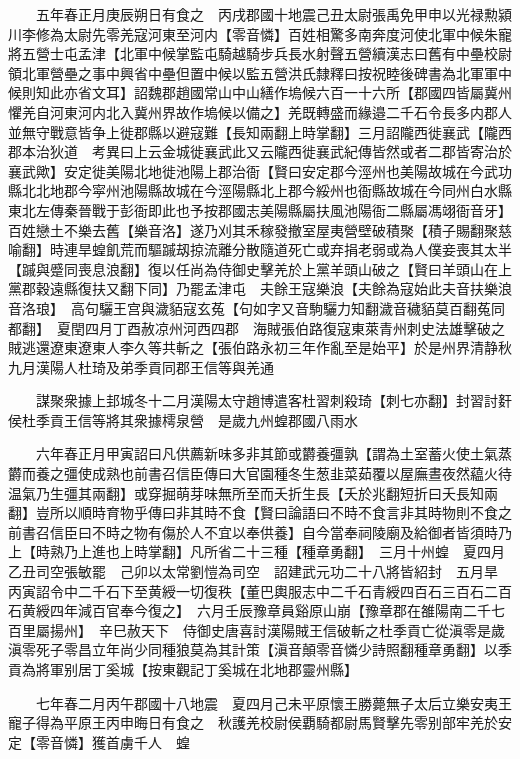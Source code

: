 　　五年春正月庚辰朔日有食之　丙戌郡國十地震己丑太尉張禹免甲申以光禄勲潁川李修為太尉先零羌寇河東至河内【零音憐】百姓相驚多南奔度河使北軍中候朱寵將五營士屯孟津【北軍中候掌監屯騎越騎步兵長水射聲五營續漢志曰舊有中壘校尉領北軍營壘之事中興省中壘但置中候以監五營洪氏隸釋曰按祝睦後碑書為北軍軍中候則知此亦省文耳】詔魏郡趙國常山中山繕作塢候六百一十六所【郡國四皆屬冀州懼羌自河東河内北入冀州界故作塢候以備之】羌既轉盛而緣邉二千石令長多内郡人並無守戰意皆争上徙郡縣以避寇難【長知兩翻上時掌翻】三月詔隴西徙襄武【隴西郡本治狄道　考異曰上云金城徙襄武此又云隴西徙襄武紀傳皆然或者二郡皆寄治於襄武歟】安定徙美陽北地徙池陽上郡治衙【賢曰安定郡今涇州也美陽故城在今武功縣北北地郡今寜州池陽縣故城在今涇陽縣北上郡今綏州也衙縣故城在今同州白水縣東北左傳秦晉戰于彭衙即此也予按郡國志美陽縣屬扶風池陽衙二縣屬馮翊衙音牙】百姓戀土不樂去舊【樂音洛】遂乃刈其禾稼發撤室屋夷營壁破積聚【積子賜翻聚慈喻翻】時連旱蝗飢荒而驅䠞刼掠流離分散隨道死亡或弃捐老弱或為人僕妾喪其太半【䠞與蹙同喪息浪翻】復以任尚為侍御史擊羌於上黨羊頭山破之【賢曰羊頭山在上黨郡穀遠縣復扶又翻下同】乃罷孟津屯　夫餘王寇樂浪【夫餘為寇始此夫音扶樂浪音洛琅】　高句驪王宫與濊貊寇玄菟【句如字又音駒驪力知翻濊音穢貊莫百翻菟同都翻】　夏閏四月丁酉赦凉州河西四郡　海賊張伯路復寇東萊青州刺史法雄擊破之賊逃還遼東遼東人李久等共斬之【張伯路永初三年作亂至是始平】於是州界清静秋九月漢陽人杜琦及弟季貢同郡王信等與羌通

　　謀聚衆據上邽城冬十二月漢陽太守趙博遣客杜習刺殺琦【刺七亦翻】封習討姧侯杜季貢王信等將其衆據樗泉營　是歲九州蝗郡國八雨水

　　六年春正月甲寅詔曰凡供薦新味多非其節或欝養彊孰【謂為土室蓄火使土氣蒸欝而養之彊使成熟也前書召信臣傳曰大官園種冬生葱韭菜茹覆以屋廡晝夜然藴火待温氣乃生彊其兩翻】或穿掘萌芽味無所至而夭折生長【夭於兆翻短折曰夭長知兩翻】豈所以順時育物乎傳曰非其時不食【賢曰論語曰不時不食言非其時物則不食之前書召信臣曰不時之物有傷於人不宜以奉供養】自今當奉祠陵廟及給御者皆須時乃上【時熟乃上進也上時掌翻】凡所省二十三種【種章勇翻】　三月十州蝗　夏四月乙丑司空張敏罷　己卯以太常劉愷為司空　詔建武元功二十八將皆紹封　五月旱　丙寅詔令中二千石下至黄綬一切復秩【董巴輿服志中二千石青綬四百石三百石二百石黄綬四年減百官奉今復之】　六月壬辰豫章員谿原山崩【豫章郡在雒陽南二千七百里屬揚州】　辛巳赦天下　侍御史唐喜討漢陽賊王信破斬之杜季貢亡從滇零是歲滇零死子零昌立年尚少同種狼莫為其計策【滇音顛零音憐少詩照翻種章勇翻】以季貢為將軍别居丁奚城【按東觀記丁奚城在北地郡靈州縣】

　　七年春二月丙午郡國十八地震　夏四月己未平原懷王勝薨無子太后立樂安夷王寵子得為平原王丙申晦日有食之　秋護羌校尉侯覇騎都尉馬賢擊先零别部牢羌於安定【零音憐】獲首虜千人　蝗

